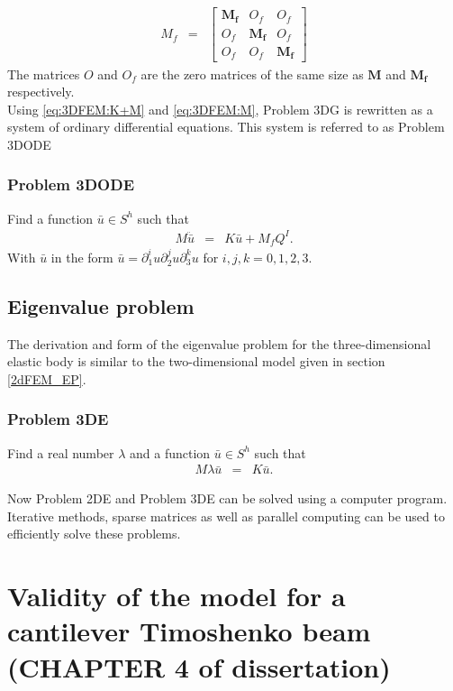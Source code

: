 	\begin{eqnarray}
		M_f & = &
		\begin{bmatrix}
			\mathbf{M_f} & {O_f} & {O_f}\\
			{O_f} & \mathbf{M_f} & {O_f}\\
			{O_f} & {O_f} & \mathbf{M_f}
		\end{bmatrix}\label{eq:3DFEM:M}
	\end{eqnarray}
	The matrices ${O}$ and ${O_f}$ are the zero matrices of the same size as $\mathbf{M}$ and $\mathbf{M_f}$ respectively.\\

	Using \eqref{eq:3DFEM:K+M} and \eqref{eq:3DFEM:M}, Problem 3DG is rewritten as a system of ordinary differential equations. This system is referred to as Problem 3DODE

	\subsubsection*{Problem 3DODE}
	Find a function $\bar{u} \in S^h$ such that
	\begin{eqnarray}
		M\ddot{\bar{u}} & = & K\bar{u} + M_{f}Q^I. \label{3D_M}
	\end{eqnarray} With $\bar{u}$ in the form $\bar{u} = \partial^i_1u \partial^j_2u \partial^k_3u$ for $i,j,k = 0,1,2,3$.

	\subsection*{Eigenvalue problem}
	The derivation and form of the eigenvalue problem for the three-dimensional elastic body is similar to the two-dimensional model given in section \ref{2dFEM_EP}.

	\subsubsection*{Problem 3DE}\label{3dFEM_EP}
	Find a real number $\lambda$ and a function $\bar{u} \in S^h$ such that
	\begin{eqnarray}
		M\lambda{\bar{u}} & = & K\bar{u}.
	\end{eqnarray}

	Now Problem 2DE and Problem 3DE can be solved using a computer program. Iterative methods, sparse matrices as well as parallel computing can be used to efficiently solve these problems.

\section{Validity of the model for a cantilever Timoshenko beam (CHAPTER 4 of dissertation)} \label{sec:validity-of-a-cantilever-timoshenko-beam}

